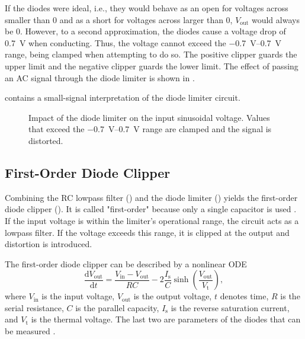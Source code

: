 If the diodes were ideal, i.e., they would behave as an open for voltages across smaller than 0 and as a short for voltages across larger than 0, $V_\text{out}$ would always be 0. However, to a second approximation, the diodes cause a voltage drop of \SI{0.7}{V} when conducting. Thus, the voltage cannot exceed the \SIrange{-0.7}{0.7}{V} range, being clamped when attempting to do so. The positive clipper guards the upper limit and the negative clipper guards the lower limit. The effect of passing an \ac{AC} signal through the diode limiter is shown in .

\cite{Yeh2007} contains a small-signal interpretation of the diode limiter circuit.

\begin{figure}
  \centering
  
  \caption{Impact of the diode limiter on the input sinusoidal voltage. Values that exceed the \SIrange{-0.7}{0.7}{V} range are clamped and the signal is distorted.}
  \label{fig:diode_limiter_signal}
\end{figure}


\subsection{First-Order Diode Clipper}
Combining the RC lowpass filter () and the diode limiter () yields the first-order diode clipper (). It is called "first-order" because only a single capacitor is used \cite{Parker2019}. If the input voltage is within the limiter's operational range, the circuit acts as a lowpass filter. If the voltage exceeds this range, it is clipped at the output and distortion is introduced.

The first-order diode clipper can be described by a nonlinear \ac{ODE} \cite{Yeh2007}
\begin{equation}
  \frac{\mathrm{d} V_\text{out}}{\mathrm{d}t} = \frac{V_\text{in} - V_\text{out}}{RC} - 2 \frac{I_\text{s}}{C} \sinh \left(\frac{V_\text{out}}{V_\text{t}}\right),
  \label{eq:diode_clipper_equation}
\end{equation}
where $V_\text{in}$ is the input voltage, $V_\text{out}$ is the output voltage, $t$ denotes time, $R$ is the serial resistance, $C$ is the parallel capacity, $I_\text{s}$ is the reverse saturation current, and $V_\text{t}$ is the thermal voltage. The last two are parameters of the diodes that can be measured \cite{Yeh2007}.

